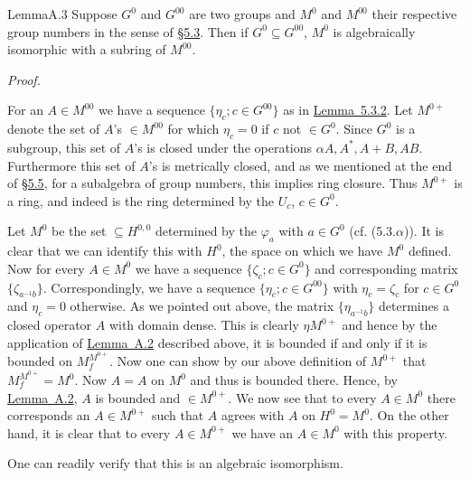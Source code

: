 \documentclass[b5paper,twoside]{article}
\newcommand{\secref}[2]{\hyperref[#1]{\mbox{\S#2}}}
\newcommand{\lemref}[2]{\hyperref[#1]{\mbox{Lemma~#2}}}
\theoremstyle{mvnplain}
\renewenvironment{proof}[1][Proof]{%
  \par\addvspace{0.35\baselineskip}%
  \noindent\textit{#1.}\ \normalfont\ignorespaces
}{%
  \par\addvspace{0.35\baselineskip}%
}
\newcommand{\M}{\mathbf M}
\newcommand{\Hilbert}{\mathfrak H}
\def\M{M}%
\def\Hilbert{H}%
\def\widetilde#1{#1}%
\def\mathfrak#1{#1}%
\begin{document}
\begin{namedstatement}{Lemma}{A.3}\label{lem:A.3}
Suppose $\mathfrak G^0$ and $\mathfrak G^{00}$ are two groups and $\M^0$ and
$\M^{00}$ their respective group numbers in the sense of
\secref{sec:5.3}{5.3}. Then if $\mathfrak G^0\subseteq\mathfrak G^{00}$,
$\M^0$ is algebraically isomorphic with a subring of $\M^{00}$.
\end{namedstatement}

\begin{proof}
For an $A\in\M^{00}$ we have a sequence
$\{\eta_c;c\in\mathfrak G^{00}\}$ as in \lemref{lem:5.3.2}{5.3.2}. Let
$\M^{0+}$ denote the set of $A$'s $\in\M^{00}$ for which $\eta_c=0$ if $c$
not $\in\mathfrak G^0$. Since $\mathfrak G^0$ is a subgroup, this set of
$A$'s is closed under the operations $\alpha A,A^*,A+B,AB$. Furthermore this
set of $A$'s is metrically closed, and as we mentioned at the end of
\secref{sec:5.5}{5.5}, for a subalgebra of group numbers, this implies ring
closure. Thus $\M^{0+}$ is a ring, and indeed is the ring determined by the
$U_c$, $c\in\mathfrak G^0$.

Let $\mathfrak M^0$ be the set $\subseteq\Hilbert^{0,0}$ determined by the
$\varphi_a$ with $a\in\mathfrak G^0$ (cf. (5.3.$\alpha$)). It is clear that we
can identify this with $\Hilbert^0$, the space on which we have $\M^0$
defined. Now for every $A\in\M^0$ we have a sequence
$\{\zeta_c;c\in\mathfrak G^0\}$ and corresponding matrix
$\{\zeta_{a^{-1}b}\}$. Correspondingly, we have a sequence
$\{\eta_c;c\in\mathfrak G^{00}\}$ with $\eta_c=\zeta_c$ for
$c\in\mathfrak G^0$ and $\eta_c=0$ otherwise. As we pointed out above, the
matrix $\{\eta_{a^{-1}b}\}$ determines a closed operator $\widetilde A$ with
domain dense. This is clearly $\mathbin{\eta}\M^{0+}$ and hence by the
application of \lemref{lem:A.2}{A.2} described above, it is bounded if and
only if it is bounded on $\mathfrak M_f^{\M^{0+}}$. Now one can show by our
above definition of $\M^{0+}$ that
$\mathfrak M_f^{\M^{0+}}=\mathfrak M^0$. Now $\widetilde A=A$ on
$\mathfrak M^0$ and thus is bounded there. Hence, by \lemref{lem:A.2}{A.2},
$\widetilde A$ is bounded and $\in\M^{0+}$. We now see that to every
$A\in\M^0$ there corresponds an $\widetilde A\in\M^{0+}$ such that
$\widetilde A$ agrees with $A$ on $\Hilbert^0=\mathfrak M^0$. On the other
hand, it is clear that to every $\widetilde A\in\M^{0+}$ we have an
$A\in\M^0$ with this property.

One can readily verify that this is an algebraic isomorphism.
\end{proof}
\end{document}

